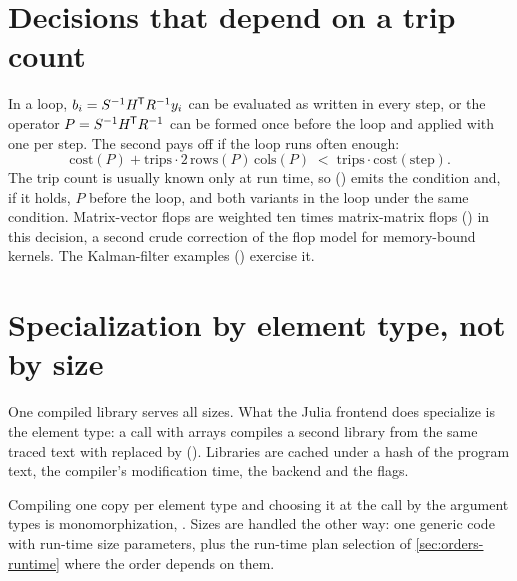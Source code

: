 \section{Decisions that depend on a trip count}
\label{sec:orders-hoist}

In a loop, \(b_i = S^{-1} H^{\mkern-1.5mu\mathsf{T}} R^{-1} y_i\) can be evaluated as written in
every step, or the operator \(P = S^{-1} H^{\mkern-1.5mu\mathsf{T}} R^{-1}\) can be formed once before
the loop and applied with one  per step. The second pays off if
the loop runs often enough:
\[
\mathrm{cost}(P) + \mathrm{trips}\cdot 2\,\mathrm{rows}(P)\,\mathrm{cols}(P)
\;<\; \mathrm{trips}\cdot\mathrm{cost}(\text{step}).
\]
The trip count is usually known only at run time, so 
() emits the condition and, if it
holds, \(P\) before the loop, and both variants in the loop under the same
condition. Matrix-vector flops are weighted ten times matrix-matrix flops
() in this decision, a second crude correction of the flop model for
memory-bound kernels. The Kalman-filter examples
() exercise it.

\section{Specialization by element type, not by size}
\label{sec:orders-spec}

One compiled library serves all sizes. What the Julia frontend does
specialize is the element type: a call with  arrays compiles
a second library from the same traced text with  replaced by
 (). Libraries are
cached under a hash of the program text, the compiler's modification time,
the backend and the flags.

\begin{theory}[ (\FGs{8.7})]
Compiling one copy per element type and choosing it at the call by the
argument types is monomorphization, . Sizes are handled the other way: one generic code with run-time
size parameters, plus the run-time plan selection of
\cref{sec:orders-runtime} where the order depends on them.
\end{theory}
